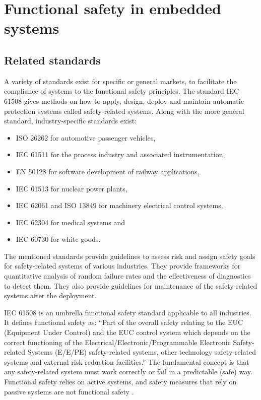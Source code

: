 \chapter{Functional safety in embedded systems}
\label{functional_safety}

\section{Related standards}

A variety of standards exist for specific or general markets, to facilitate the compliance of systems to the functional safety principles. The standard IEC 61508 gives methods on how to apply, design, deploy and maintain automatic protection systems called safety-related systems.
Along with the more general standard, industry-specific standards exist:
\begin{itemize}

    \item ISO 26262 for automotive passenger vehicles,
    \item IEC 61511 for the process industry and associated instrumentation,
    \item EN 50128 for software development of railway applications,
    \item IEC 61513 for nuclear power plants,
    \item IEC 62061 and ISO 13849 for machinery electrical control systems,
    \item IEC 62304 for medical systems and
    \item IEC 60730 for white goods.

\end{itemize}

The mentioned standards provide guidelines to assess risk and assign safety goals for safety-related systems of various industries. They provide frameworks for quantitative analysis of random failure rates and the effectiveness of diagnostics to detect them. They also provide guidelines for maintenance of the safety-related systems after the deployment.

IEC 61508 is an umbrella functional safety standard applicable to all industries. It defines functional safety as: “Part of the overall safety relating to the EUC (Equipment Under Control) and the EUC control system which depends on the correct functioning of the Electrical/Electronic/Programmable Electronic Safety-related Systems (E/E/PE) safety-related systems, other technology safety-related systems and external risk reduction facilities.” The fundamental concept is that any safety-related system must work correctly or fail in a predictable (safe) way. Functional safety relies on active systems, and safety measures that rely on passive systems are not functional safety \citep{func_safety_explained}. 


